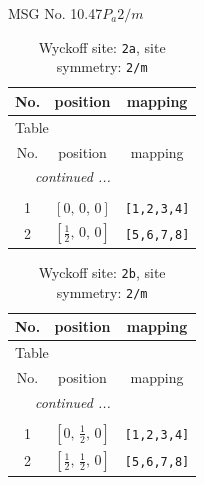 \documentclass[fleqn,8pt]{jsarticle}
\begin{document}
\setcounter{MaxMatrixCols}{32}

\renewcommand{\tablename}{Table~}
\renewcommand{\figurename}{Figure~}
\begin{center}
\LARGE
MSG No. 10.47\quad$P_{a}2/m$
\end{center}
\renewcommand{\arraystretch}{1.2}
\begin{longtable}{ccc}
\caption{Wyckoff site: {\tt 2a}, site symmetry: {\tt 2/m}}
 \\
 \hline \hline
No. & position & mapping \\ \hline \endfirsthead

\multicolumn{2}{l}{\tablename\ \thetable{}} \\
 \hline \hline
No. & position & mapping \\ \hline \endhead

 \hline \hline
\multicolumn{2}{r}{\footnotesize\it continued ...} \\ \endfoot

 \hline \hline
\multicolumn{2}{r}{} \\ \endlastfoot

1 & $\left[ 0,\, 0,\, 0 \right]$ & {\tt [1,2,3,4]} \\ \hline
2 & $\left[ \frac{1}{2},\, 0,\, 0 \right]$ & {\tt [5,6,7,8]} \\
\end{longtable}
\renewcommand{\arraystretch}{1.2}
\begin{longtable}{ccc}
\caption{Wyckoff site: {\tt 2b}, site symmetry: {\tt 2/m}}
 \\
 \hline \hline
No. & position & mapping \\ \hline \endfirsthead

\multicolumn{2}{l}{\tablename\ \thetable{}} \\
 \hline \hline
No. & position & mapping \\ \hline \endhead

 \hline \hline
\multicolumn{2}{r}{\footnotesize\it continued ...} \\ \endfoot

 \hline \hline
\multicolumn{2}{r}{} \\ \endlastfoot

1 & $\left[ 0,\, \frac{1}{2},\, 0 \right]$ & {\tt [1,2,3,4]} \\ \hline
2 & $\left[ \frac{1}{2},\, \frac{1}{2},\, 0 \right]$ & {\tt [5,6,7,8]} \\
\end{longtable}
\renewcommand{\arraystretch}{1.2}
\end{document}
